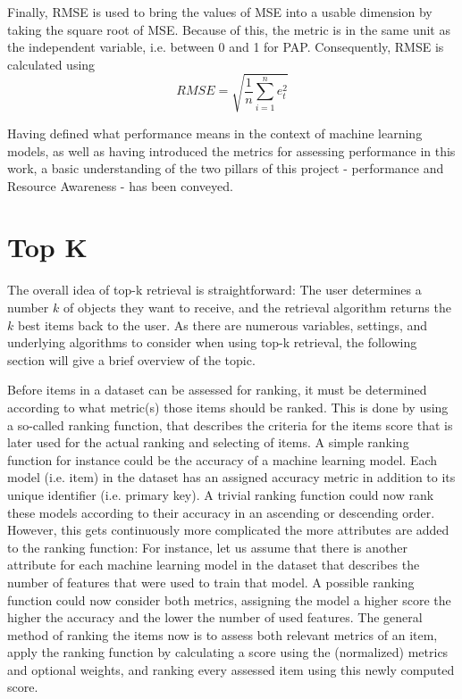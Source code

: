 Finally, RMSE is used to bring the values of MSE into a usable dimension by taking the square root of MSE. Because of this, the metric is in the same unit as the independent variable, i.e. between 0 and 1 for PAP. Consequently, RMSE is calculated using
\begin{equation*}
RMSE = \sqrt{\frac{1}{n} \sum_{i=1}^n e_t^2 }
\label{rmse}
\end{equation*}


Having defined what performance means in the context of machine learning models, as well as having introduced the metrics for assessing performance in this work, a basic understanding of the two pillars of this project - performance and Resource Awareness - has been conveyed. 



\section{Top K}

The overall idea of top-k retrieval is straightforward: The user determines a number $k$ of objects they want to receive, and the retrieval algorithm returns the $k$ best items back to the user. As there are numerous variables, settings, and underlying algorithms to consider when using top-k retrieval, the following section will give a brief overview of the topic. 

Before items in a dataset can be assessed for ranking, it must be determined according to what metric(s) those items should be ranked. This is done by using a so-called ranking function, that describes the criteria for the items score that is later used for the actual ranking and selecting of items. A simple ranking function for instance could be the accuracy of a machine learning model. Each model (i.e. item) in the dataset has an assigned accuracy metric in addition to its unique identifier (i.e. primary key). A trivial ranking function could now rank these models according to their accuracy in an ascending or descending order. However, this gets continuously more complicated the more attributes are added to the ranking function: For instance, let us assume that there is another attribute for each machine learning model in the dataset that describes the number of features that were used to train that model. A possible ranking function could now consider both metrics, assigning the model a higher score the higher the accuracy and the lower the number of used features. The general method of ranking the items now is to assess both relevant metrics of an item, apply the ranking function by calculating a score using the (normalized) metrics and optional weights, and ranking every assessed item using this newly computed score. 

